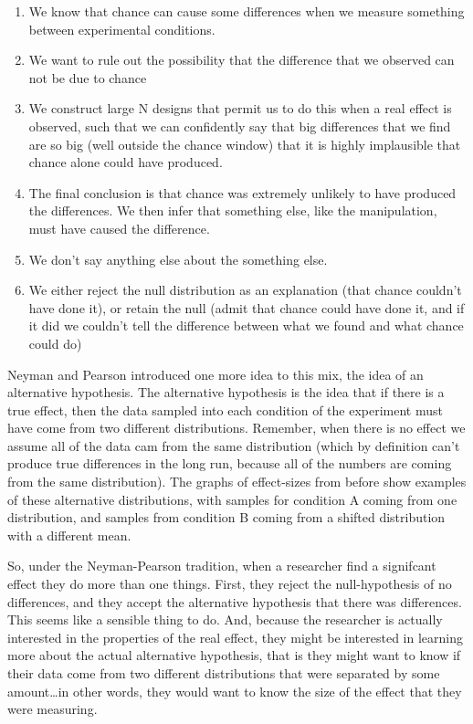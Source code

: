 \documentclass[
]{book}
\providecommand{\tightlist}{%
  \setlength{\itemsep}{0pt}\setlength{\parskip}{0pt}}
\begin{document}
\begin{enumerate}
\def\labelenumi{\arabic{enumi}.}
\tightlist
\item
  We know that chance can cause some differences when we measure something between experimental conditions.
\item
  We want to rule out the possibility that the difference that we observed can not be due to chance
\item
  We construct large N designs that permit us to do this when a real effect is observed, such that we can confidently say that big differences that we find are so big (well outside the chance window) that it is highly implausible that chance alone could have produced.
\item
  The final conclusion is that chance was extremely unlikely to have produced the differences. We then infer that something else, like the manipulation, must have caused the difference.
\item
  We don't say anything else about the something else.
\item
  We either reject the null distribution as an explanation (that chance couldn't have done it), or retain the null (admit that chance could have done it, and if it did we couldn't tell the difference between what we found and what chance could do)
\end{enumerate}

Neyman and Pearson introduced one more idea to this mix, the idea of an alternative hypothesis. The alternative hypothesis is the idea that if there is a true effect, then the data sampled into each condition of the experiment must have come from two different distributions. Remember, when there is no effect we assume all of the data cam from the same distribution (which by definition can't produce true differences in the long run, because all of the numbers are coming from the same distribution). The graphs of effect-sizes from before show examples of these alternative distributions, with samples for condition A coming from one distribution, and samples from condition B coming from a shifted distribution with a different mean.

So, under the Neyman-Pearson tradition, when a researcher find a signifcant effect they do more than one things. First, they reject the null-hypothesis of no differences, and they accept the alternative hypothesis that there was differences. This seems like a sensible thing to do. And, because the researcher is actually interested in the properties of the real effect, they might be interested in learning more about the actual alternative hypothesis, that is they might want to know if their data come from two different distributions that were separated by some amount\ldots in other words, they would want to know the size of the effect that they were measuring.
\end{document}
